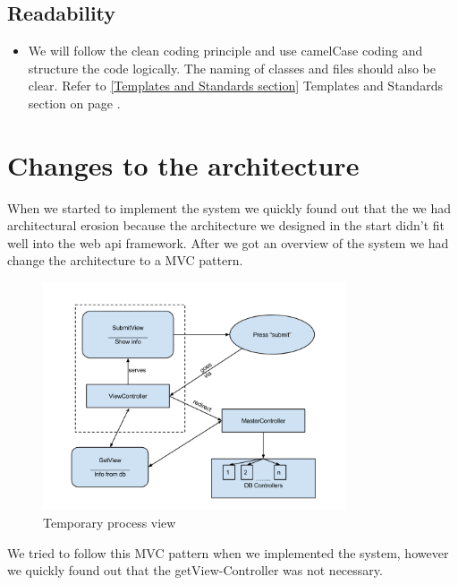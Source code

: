 \subsection{Readability}
\begin{itemize}
\item We will follow the clean coding principle and use camelCase coding and structure the code logically. The naming of classes and files should also be clear. Refer to \ref{Templates and Standards section} Templates and Standards section on page \pageref{Templates and Standards section}.
\end{itemize}

\section{Changes to the architecture}
When we started to implement the system we quickly found out that the we had architectural erosion because the architecture we designed in the start didn't fit well into the web api framework. After we got an overview of the system we had change the architecture to a MVC pattern. 
\begin{figure}[H]
\centering
\includegraphics[width=0.8\textwidth]{images/architecture03_revised1.png}
\caption{Temporary process view}
\label{fig:info_flow}
\end{figure}
We tried to follow this MVC pattern when we implemented the system, however we quickly found out that the getView-Controller was not necessary.
